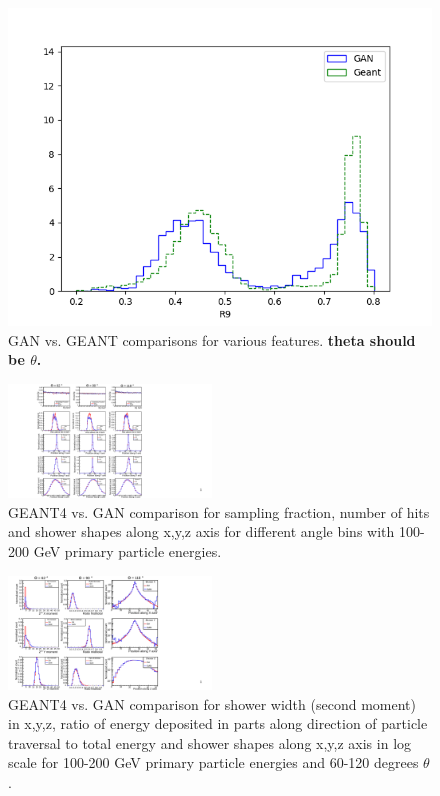\begin{figure}
    \includegraphics[scale=0.3]{Images/Calo/GAN_feature_R9.png}
    \caption{GAN vs. GEANT comparisons for various features. {\bf theta should be $\theta$.}
    \label{fig:GAN_features}}
\end{figure}
\fi
\begin{figure}
    \centering
    \includegraphics[width=0.48\textwidth, trim={4cm 0cm 9cm 0cm}, clip=true]{Images/Calo/features_1_rev.pdf}
    \caption{GEANT4 vs. GAN comparison for sampling fraction, number
      of hits and shower shapes along x,y,z axis for different angle
      bins with 100-200 GeV primary particle energies.
      \label{fig:GAN_features1}}
\end{figure}

\begin{figure}
    \centering
    \includegraphics[width=0.48\textwidth, trim={1cm 0cm 7cm 0cm}, clip=true]{Images/Calo/features_2_rev.pdf}
    \caption{GEANT4 vs. GAN comparison for shower width (second
      moment) in x,y,z, ratio of energy deposited in parts along
      direction of particle traversal to total energy and shower
      shapes along x,y,z axis in log scale for 100-200 GeV primary
      particle energies and 60-120 degrees $\theta$.
      \label{fig:GAN_features2}}
\end{figure}

